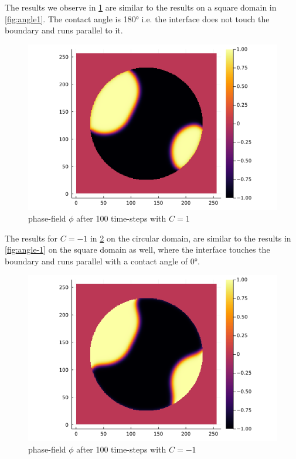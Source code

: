 \documentclass{mimosis}
\begin{document}
The results we observe in \ref{fig:angle1c} are similar to the results on a square domain in \ref{fig:angle1}. The contact angle is 180° i.e. the interface does not touch the boundary and runs parallel to it.
\begin{figure}[htbp]
\centering
\includegraphics[width=.9\linewidth]{images/anfle1c.png}
\caption{\label{fig:angle1c}phase-field \(\phi\) after 100 time-steps with \(C=1\)}
\end{figure}

The results for \(C=-1\) in \ref{fig:angle-1c} on the circular domain, are similar to the results in \ref{fig:angle-1} on the square domain as well, where the interface touches the boundary and runs parallel with a contact angle of 0°.
\begin{figure}[htbp]
\centering
\includegraphics[width=.9\linewidth]{images/angle-1c.png}
\caption{\label{fig:angle-1c}phase-field \(\phi\) after 100 time-steps with \(C=-1\)}
\end{figure}
\end{document}
